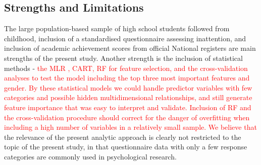 \documentclass[10pt,letterpaper]{article}
\begin{document}
{{%
% 
%

 \subsection*{Strengths and Limitations}
The large population-based sample of high school students followed from childhood, inclusion of a standardised questionnaire assessing inattention, and inclusion of academic achievement scores from official National registers are main strengths of the present study. Another strength is the inclusion of statistical methods - \textcolor{red}{the MLR , CART, RF for feature selection, and the cross-validation analyses to test the model including the top three most important features and gender. By these statistical models we could handle predictor variables with few categories and possible hidden multidimensional relationships, and still generate feature importance that was easy to interpret and validate. Inclusion of RF and the cross-validation procedure should correct for the danger of overfitting when including a high number of variables in a relatively small sample. We believe that} the relevance of the present analytic approach is clearly not restricted to the topic of the present study, in that questionnaire data with only a few response categories are commonly used in psychological research. \\

}}
\end{document}
